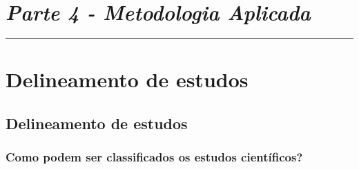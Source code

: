 \documentclass[
  a4paper,
]{book}
\begin{document}

\hypertarget{parte-4---metodologia-aplicada}{%
\chapter*{\texorpdfstring{\emph{Parte 4 - Metodologia Aplicada}}{Parte 4 - Metodologia Aplicada}}\label{parte-4---metodologia-aplicada}}

\markboth{}{}
\par\noindent\rule{\textwidth}{0.05in}

\hypertarget{delineamento-estudos}{%
\chapter{\texorpdfstring{\textbf{Delineamento de estudos}}{Delineamento de estudos}}\label{delineamento-estudos}}

\hypertarget{delineamento-estudos}{%
\section{Delineamento de estudos}\label{delineamento-estudos}}

\hypertarget{como-podem-ser-classificados-os-estudos-cientuxedficos}{%
\subsection{Como podem ser classificados os estudos científicos?}\label{como-podem-ser-classificados-os-estudos-cientuxedficos}}
\end{document}
